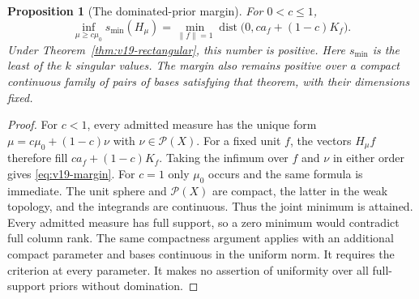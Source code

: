 \documentclass[11pt]{amsart}
\newtheorem{proposition}[theorem]{Proposition}
\theoremstyle{definition}\newtheorem{definition}[theorem]{Definition}
\theoremstyle{remark}\newtheorem{remark}[theorem]{Remark}
\newcommand{\cP}{\mathcal P}\newcommand{\cG}{\mathcal G}
\begin{document}
\begin{proposition}[The dominated-prior margin]
\label{prop:v19-dominated-margin}
For $0<c\le1$,
\begin{equation}\label{eq:v19-margin}
 \inf_{\mu\ge c\mu_0}s_{\min}(H_\mu)
 =\min_{\|f\|=1}\operatorname{dist}
                 \bigl(0,c a_f+(1-c)K_f\bigr).
\end{equation}
Under Theorem~\ref{thm:v19-rectangular}, this number is positive.
Here $s_{\min}$ is the least of the $k$ singular values. The margin
also remains positive over a compact continuous family of pairs of
bases satisfying that theorem, with their dimensions fixed.
\end{proposition}
\begin{proof}
For $c<1$, every admitted measure has the unique form
$\mu=c\mu_0+(1-c)\nu$ with $\nu\in\cP(X)$. For a fixed unit $f$,
the vectors $H_\mu f$ therefore fill $c a_f+(1-c)K_f$.
Taking the infimum over $f$ and $\nu$ in either order gives
\eqref{eq:v19-margin}. For $c=1$ only $\mu_0$ occurs and the same
formula is immediate. The unit sphere and $\cP(X)$ are compact,
the latter in the weak topology, and the integrands are continuous.
Thus the joint minimum is attained. Every admitted measure has full
support, so a zero minimum would contradict full column rank.
The same compactness argument applies with an additional compact
parameter and bases continuous in the uniform norm. It requires the
criterion at every parameter. It makes no assertion of uniformity over
all full-support priors without domination.
\end{proof}
\end{document}
